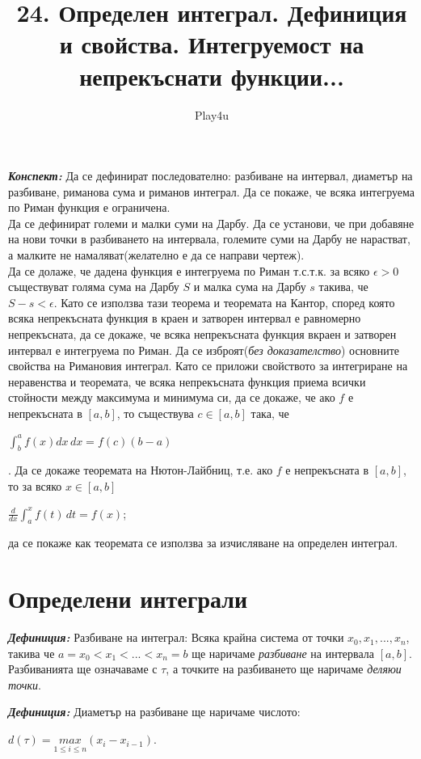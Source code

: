 \documentclass[11pt]{article} %
\title{24. Определен интеграл. Дефиниция и свойства. Интегруемост на непрекъснати функции...}
\author{Play4u}
\newcommand{\italicBold}[1]{\textbf{\emph{#1}}}
\newcommand{\definition}{\italicBold{Дефиниция: }}
\newcommand{\integral}[4]{\displaystyle \int_{#1}^{#2}#3\,#4}
\begin{document}
\maketitle

\italicBold{Конспект: } Да се дефинират последователно: разбиване на интервал, диаметър на разбиване, риманова сума и риманов интеграл. Да се покаже, че всяка интегруема по Риман функция е ограничена.\\
Да се дефинират големи и малки суми на Дарбу. Да се установи, че при добавяне на нови точки в разбиването на интервала, големите суми на Дарбу не нарастват, а малките не намаляват(желателно е да се направи чертеж).\\
Да се долаже, че дадена функция е интегруема по Риман т.с.т.к. за всяко $\epsilon > 0$ съществуват голяма сума на Дарбу $S$ и малка сума на Дарбу $s$ такива, че $S-s < \epsilon$. Като се използва тази теорема и теоремата на Кантор, според която всяка непрекъсната функция в краен и затворен интервал е равномерно непрекъсната, да се докаже, че всяка непрекъсната функция вкраен и затворен интервал е интегруема по Риман. Да се изброят(\textit{без доказателство}) основните свойства на Римановия интеграл. Като се приложи свойството за интегриране на неравенства и теоремата, че всяка непрекъсната функция приема всички стойности между максимума и минимума си, да се докаже, че ако $f$ е непрекъсната в $[a,b]$, то съществува $c \in [a,b]$ така, че \\
\centerline{$\displaystyle\int_{b}^{a}f(x)dx\,dx=f(c)(b-a)$}.
Да се докаже теоремата на Нютон-Лайбниц, т.е. ако $f$ е непрекъсната в $[a,b]$, то за всяко $x \in [a,b]$\\
\centerline{$\displaystyle\frac{d}{dx}\integral{a}{x}{f(t)}{dt}=f(x)$;}
да се покаже как теоремата се използва за изчисляване на определен интеграл.

\section{Определени интеграли}

\definition Разбиване на интеграл: Всяка крайна система от точки $x_{0}, x_{1},...,x_{n}$, такива че $a = x_{0} < x_{1} < ...< x_{n} = b$ ще наричаме \textit{разбиване} на интервала $[a,b]$. Разбиванията ще означаваме с $\tau$, а точките на разбиването ще наричаме \textit{деляюи точки}. \\\par

\definition Диаметър на разбиване ще наричаме числото:\\
\centerline{$d(\tau)=\underset{1\leq i\leq n}{max}(x_{i}-x_{i-1})$.}\\\par
\end{document}

